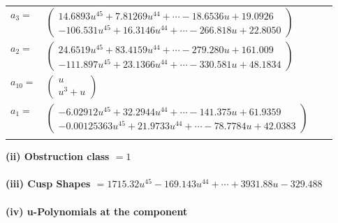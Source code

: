 \documentclass[1p]{elsarticle_modified}
\theoremstyle{definition}
\begin{document}
\begin{tabular}{m{7pt} m{180pt} m{7pt} m{180pt} }
\flushright $a_{3}=$&$\begin{pmatrix}14.6893 u^{45}+7.81269 u^{44}+\cdots-18.6536 u+19.0926\\-106.531 u^{45}+16.3146 u^{44}+\cdots-266.818 u+22.8050\end{pmatrix}$ \\
\flushright $a_{2}=$&$\begin{pmatrix}24.6519 u^{45}+83.4159 u^{44}+\cdots-279.280 u+161.009\\-111.897 u^{45}+23.1366 u^{44}+\cdots-330.581 u+48.1834\end{pmatrix}$ \\
\flushright $a_{10}=$&$\begin{pmatrix}u\\u^3+u\end{pmatrix}$ \\
\flushright $a_{1}=$&$\begin{pmatrix}-6.02912 u^{45}+32.2944 u^{44}+\cdots-141.375 u+61.9359\\-0.00125363 u^{45}+21.9733 u^{44}+\cdots-78.7784 u+42.0383\end{pmatrix}$\\&\end{tabular}
\flushleft \textbf{(ii) Obstruction class $= 1$}\\~\\
\flushleft \textbf{(iii) Cusp Shapes $= 1715.32 u^{45}-169.143 u^{44}+\cdots+3931.88 u-329.488$}\\~\\
\newpage\renewcommand{\arraystretch}{1}
\flushleft \textbf{(iv) u-Polynomials at the component}\newline \\
\end{document}

